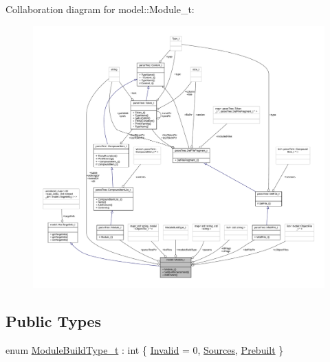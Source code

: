 Collaboration diagram for model\+:\+:Module\+\_\+t\+:
\nopagebreak
\begin{figure}[H]
\begin{center}
\leavevmode
\includegraphics[width=350pt]{structmodel_1_1_module__t__coll__graph}
\end{center}
\end{figure}
\subsection*{Public Types}
\begin{DoxyCompactItemize}
\item 
enum \hyperlink{structmodel_1_1_module__t_a6c9277eb6ec850a82742e5be2ff28b46}{Module\+Build\+Type\+\_\+t} \+: int \{ \hyperlink{structmodel_1_1_module__t_a6c9277eb6ec850a82742e5be2ff28b46af5ac4d44be7fc590cd6683d9fd605b53}{Invalid} = 0, 
\hyperlink{structmodel_1_1_module__t_a6c9277eb6ec850a82742e5be2ff28b46abd90ee1d0e8aeb25de1da68585886536}{Sources}, 
\hyperlink{structmodel_1_1_module__t_a6c9277eb6ec850a82742e5be2ff28b46a920f5cd84dd695233096981e4debcc70}{Prebuilt}
 \}
\end{DoxyCompactItemize}
